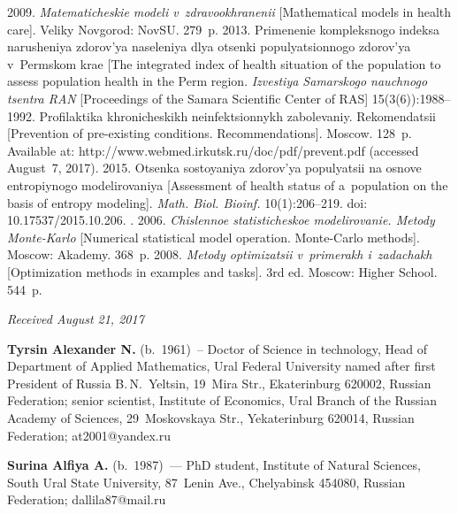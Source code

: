 \begin{multicols}{2}
{{\begin{thebibliography}{99}
 2009. \textit{Ma\-te\-ma\-ti\-che\-skie 
modeli v~zdra\-vo\-okh\-ra\-ne\-nii} [Mathematical models in health care]. Veliky 
Novgorod: NovSU. 279~p.
 2013. Pri\-me\-ne\-nie 
komp\-leks\-no\-go indek\-sa na\-ru\-she\-niya zdo\-rov'ya na\-se\-le\-niya dlya otsen\-ki 
po\-pu\-lya\-tsi\-on\-no\-go zdo\-rov'ya v~Permskom krae [The integrated index of health 
situation of the population to assess population health in the Perm region.
\textit{Izvestiya Samarskogo nauchnogo tsent\-ra RAN} [Proceedings of the Samara 
Scientific Center of RAS] 15(3(6)):1988--1992.
Profilaktika khro\-ni\-che\-skikh ne\-in\-fek\-tsi\-on\-nykh za\-bo\-le\-va\-niy. 
Re\-ko\-men\-da\-tsii 
[Prevention of pre-existing conditions. Recommendations]. Moscow. 128~p.
Available at: {\sf 
http://www.webmed.irkutsk.ru/doc/pdf/prevent.pdf} (accessed August~7, 2017).
 2015. 
Otsen\-ka so\-sto\-yaniya zdo\-rov'ya po\-pu\-lya\-tsii 
na osnove entropiynogo mo\-de\-li\-ro\-va\-niya 
[Assessment of health status of a~population on the basis of entropy modeling]. 
\textit{Math. Biol. Bioinf.} 10(1):206--219. doi: 10.17537/2015.10.206.
. 2006. \textit{Chis\-len\-noe 
sta\-ti\-sti\-che\-skoe mo\-de\-li\-ro\-va\-nie. Metody Monte-Karlo} [Numerical statistical model 
operation. Monte-Carlo methods]. Moscow: Akademy. 368~p.
 2008. \textit{Metody op\-ti\-mi\-za\-tsii 
v~pri\-me\-rakh i~za\-da\-chakh} [Optimization methods in examples and tasks]. 3rd ed. 
Moscow: Higher School. 544~p.
\end{thebibliography}

 }
 }

\end{multicols}

\vspace*{-3pt}

\hfill{\small\textit{Received August 21, 2017}}


\Contr

\noindent
\textbf{Tyrsin Alexander N.} (b.\ 1961)~-- Doctor of Science in technology, Head of 
Department of Applied Mathematics, Ural Federal University named after first 
President of Russia B.\,N.~Yeltsin, 19~Mira Str., Ekaterinburg 620002, Russian 
Federation; senior scientist, Institute of Economics, Ural Branch of the Russian 
Academy of Sciences, 29~Moskovskaya Str., Yekaterinburg 620014, Russian 
Federation; \mbox{at2001@yandex.ru} 

\vspace*{3pt}

\noindent
\textbf{Surina Alfiya A.} (b.\ 1987)~--- PhD student, Institute of Natural Sciences, 
South Ural State University, 87~Lenin Ave., Chelyabinsk 454080, Russian 
Federation; \mbox{dallila87@mail.ru} 



\label{end\stat}


\renewcommand{\bibname}{\protect\rm Литература} 